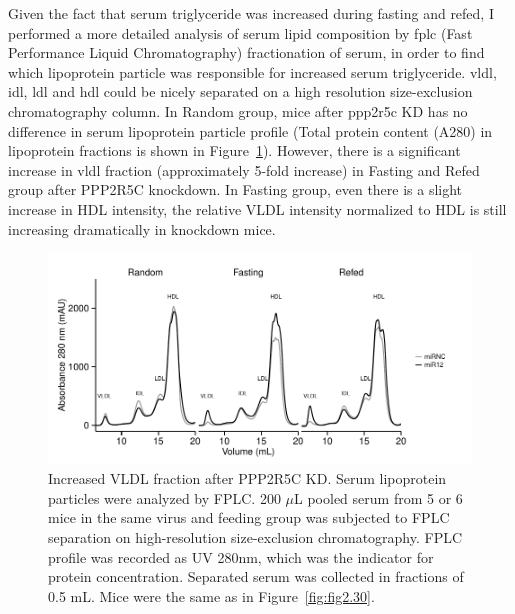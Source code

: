 Given the fact that serum triglyceride was increased during fasting and refed, I performed a more detailed analysis of serum lipid composition by \gls{fplc} (Fast Performance Liquid Chromatography) fractionation of serum, in order to find which lipoprotein particle was responsible for increased serum triglyceride. \gls{vldl}, \gls{idl}, \gls{ldl} and \gls{hdl} could be nicely separated on a high resolution size-exclusion chromatography column. In Random group, mice after \gls{ppp2r5c} KD has no difference in serum lipoprotein particle profile (Total protein content (A280) in lipoprotein fractions is shown in Figure~\ref{fig:fig2.42}). However, there is a significant increase in \gls{vldl} fraction (approximately 5-fold increase) in Fasting and Refed group after PPP2R5C knockdown. In Fasting group, even there is a slight increase in HDL intensity, the relative VLDL intensity normalized to HDL is still increasing dramatically in knockdown mice. 

\begin{figure}[htbp]
\centering
\includegraphics[width=1\textwidth]{figs/fig2-42 fplc_profile.pdf}
\caption[Serum FPLC profile]{\footnotesize Increased VLDL fraction after PPP2R5C KD. Serum lipoprotein particles were analyzed by FPLC. 200 $\mu$L pooled serum from 5 or 6 mice in the same virus and feeding group was subjected to FPLC separation on high-resolution size-exclusion chromatography. FPLC profile was recorded as UV 280nm, which was the indicator for protein concentration. Separated serum was collected in fractions of 0.5 mL. Mice were the same as in Figure~\ref{fig:fig2.30}.}
\label{fig:fig2.42}
\end{figure}

